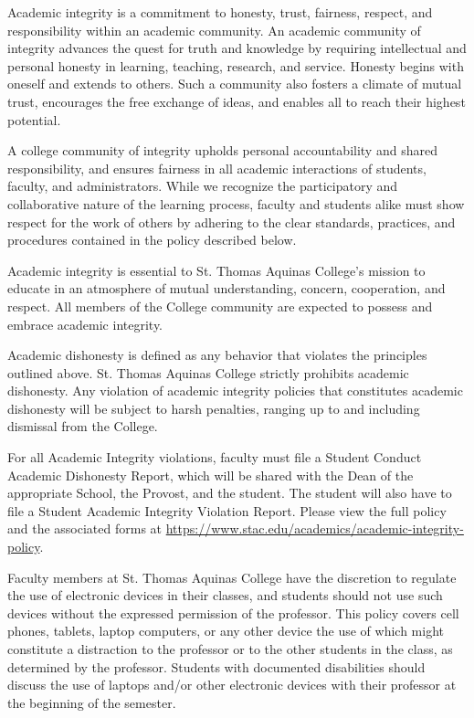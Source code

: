 \documentclass[11pt,letterpaper]{article}
\begin{document}
Academic integrity is a commitment to honesty, trust, fairness, respect, and responsibility within an academic community. An academic community of integrity advances the quest for truth and knowledge by requiring intellectual and personal honesty in learning, teaching, research, and service. Honesty begins with oneself and extends to others. Such a community also fosters a climate of mutual trust, encourages the free exchange of ideas, and enables all to reach their highest potential. \pspace

A college community of integrity upholds personal accountability and shared responsibility, and ensures fairness in all academic interactions of students, faculty, and administrators. While we recognize the participatory and collaborative nature of the learning process, faculty and students alike must show respect for the work of others by adhering to the clear standards, practices, and procedures contained in the policy described below. \pspace

Academic integrity is essential to St. Thomas Aquinas College’s mission to educate in an atmosphere of mutual understanding, concern, cooperation, and respect. All members of the College community are expected to possess and embrace academic integrity. \sectionbreak




Academic dishonesty is defined as any behavior that violates the principles outlined above. St. Thomas Aquinas College strictly prohibits academic dishonesty. Any violation of academic integrity policies that constitutes academic dishonesty will be subject to harsh penalties, ranging up to and including dismissal from the College.

For all Academic Integrity violations, faculty must file a Student Conduct Academic Dishonesty Report, which will be shared with the Dean of the appropriate School, the Provost, and the student. The student will also have to file a Student Academic Integrity Violation Report. Please view the full policy and the associated forms at \url{https://www.stac.edu/academics/academic-integrity-policy}. \sectionbreak




Faculty members at St. Thomas Aquinas College have the discretion to regulate the use of electronic devices in their classes, and students should not use such devices without the expressed permission of the professor. This policy covers cell phones, tablets, laptop computers, or any other device the use of which might constitute a distraction to the professor or to the other students in the class, as determined by the professor. Students with documented disabilities should discuss the use of laptops and/or other electronic devices with their professor at the beginning of the semester. \pspace
\end{document}

